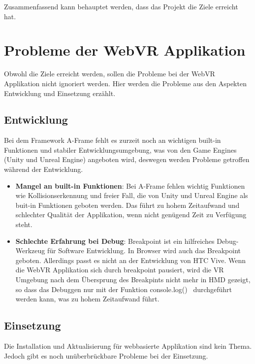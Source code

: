 Zusammenfassend kann behauptet werden, dass das Projekt die Ziele erreicht hat.

\section{Probleme der WebVR Applikation}
Obwohl die Ziele erreicht werden, sollen die Probleme bei der WebVR Applikation nicht ignoriert werden. Hier werden die Probleme aus den Aspekten Entwicklung und Einsetzung erzählt.

\subsection{Entwicklung}

Bei dem Framework A-Frame fehlt es zurzeit noch an wichtigen built-in Funktionen und stabiler Entwicklungsumgebung, was von den Game Engines (Unity und Unreal Engine) angeboten wird, deswegen werden Probleme getroffen während der Entwicklung. 

\begin{itemize}
    \item \textbf{Mangel an built-in Funktionen}: Bei A-Frame fehlen wichtig Funktionen wie Kollisionserkennung und freier Fall, die von Unity und Unreal Engine als buit-in Funktionen geboten werden. Das führt zu hohem Zeitaufwand und schlechter Qualität der Applikation, wenn nicht genügend Zeit zu Verfügung steht.
    
    \item \textbf{Schlechte Erfahrung bei Debug}: Breakpoint ist ein hilfreiches Debug-Werkzeug für Software Entwicklung. In Browser wird auch das Breakpoint geboten. Allerdings passt es nicht an der Entwicklung von HTC Vive. Wenn die WebVR Applikation sich durch breakpoint pausiert, wird die VR Umgebung nach dem Übersprung des Breakpints nicht mehr in HMD gezeigt, so dass das Debuggen nur mit der Funktion \glqq console.log() \grqq\ durchgeführt werden kann, was zu hohem Zeitaufwand führt.
    
\end{itemize}

\subsection{Einsetzung}

Die Installation und Aktualisierung für webbasierte Applikation sind kein Thema. Jedoch gibt es noch unüberbrückbare Probleme bei der Einsetzung.


